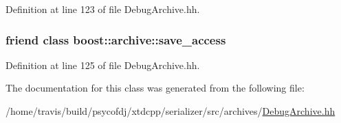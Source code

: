 Definition at line 123 of file Debug\-Archive.\-hh.

\hypertarget{classxtd_1_1serializer_1_1DebugTextOArchive_aaca003bb8a4fc59424e4025130da4edd}{
\subsubsection[{boost\-::archive\-::save\-\_\-access}]{\setlength{\rightskip}{0pt plus 5cm}friend class boost\-::archive\-::save\-\_\-access\hspace{0.3cm}{\ttfamily [friend]}}}\label{classxtd_1_1serializer_1_1DebugTextOArchive_aaca003bb8a4fc59424e4025130da4edd}


Definition at line 125 of file Debug\-Archive.\-hh.



The documentation for this class was generated from the following file\-:\begin{DoxyCompactItemize}
\item 
/home/travis/build/psycofdj/xtdcpp/serializer/src/archives/\hyperlink{DebugArchive_8hh}{Debug\-Archive.\-hh}\end{DoxyCompactItemize}

